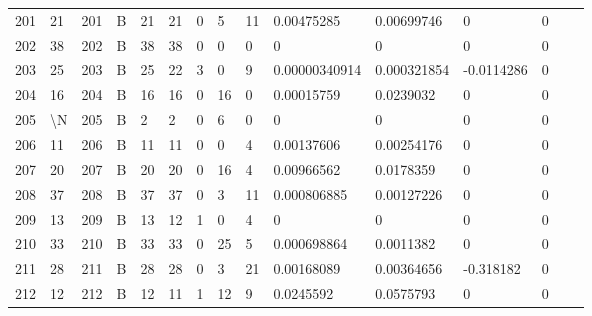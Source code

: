 \begin{longtable}{lllllllllllllll}
	201 & 21                & 201 & B   & 21                & 21                & 0                 & 5    & 11         & 0.00475285     & 0.00699746     & 0             & 0            \\
	202 & 38                & 202 & B   & 38                & 38                & 0                 & 0    & 0          & 0              & 0              & 0             & 0            \\
	203 & 25                & 203 & B   & 25                & 22                & 3                 & 0    & 9          & 0.00000340914  & 0.000321854    & -0.0114286    & 0            \\
	204 & 16                & 204 & B   & 16                & 16                & 0                 & 16   & 0          & 0.00015759     & 0.0239032      & 0             & 0            \\
	205 & \textbackslash{}N & 205 & B   & 2                 & 2                 & 0                 & 6    & 0          & 0              & 0              & 0             & 0            \\
	206 & 11                & 206 & B   & 11                & 11                & 0                 & 0    & 4          & 0.00137606     & 0.00254176     & 0             & 0            \\
	207 & 20                & 207 & B   & 20                & 20                & 0                 & 16   & 4          & 0.00966562     & 0.0178359      & 0             & 0            \\
	208 & 37                & 208 & B   & 37                & 37                & 0                 & 3    & 11         & 0.000806885    & 0.00127226     & 0             & 0            \\
	209 & 13                & 209 & B   & 13                & 12                & 1                 & 0    & 4          & 0              & 0              & 0             & 0            \\
	210 & 33                & 210 & B   & 33                & 33                & 0                 & 25   & 5          & 0.000698864    & 0.0011382      & 0             & 0            \\
	211 & 28                & 211 & B   & 28                & 28                & 0                 & 3    & 21         & 0.00168089     & 0.00364656     & -0.318182     & 0            \\
	212 & 12                & 212 & B   & 12                & 11                & 1                 & 12   & 9          & 0.0245592      & 0.0575793      & 0             & 0            \\

\end{longtable}
